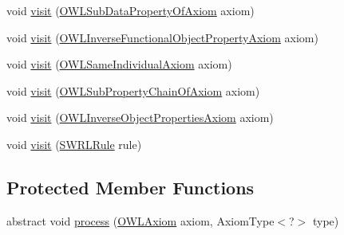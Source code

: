 \begin{DoxyCompactItemize}
void \hyperlink{classorg_1_1semanticweb_1_1owlapi_1_1util_1_1_o_w_l_axiom_type_processor_a7f7b9a60dcffb15d69dcacf790733ce5}{visit} (\hyperlink{interfaceorg_1_1semanticweb_1_1owlapi_1_1model_1_1_o_w_l_sub_data_property_of_axiom}{O\-W\-L\-Sub\-Data\-Property\-Of\-Axiom} axiom)
\item 
void \hyperlink{classorg_1_1semanticweb_1_1owlapi_1_1util_1_1_o_w_l_axiom_type_processor_ac7b5b706ad36505436fa590615f41cfb}{visit} (\hyperlink{interfaceorg_1_1semanticweb_1_1owlapi_1_1model_1_1_o_w_l_inverse_functional_object_property_axiom}{O\-W\-L\-Inverse\-Functional\-Object\-Property\-Axiom} axiom)
\item 
void \hyperlink{classorg_1_1semanticweb_1_1owlapi_1_1util_1_1_o_w_l_axiom_type_processor_ac69c5714146130044f5cae45fedaf92f}{visit} (\hyperlink{interfaceorg_1_1semanticweb_1_1owlapi_1_1model_1_1_o_w_l_same_individual_axiom}{O\-W\-L\-Same\-Individual\-Axiom} axiom)
\item 
void \hyperlink{classorg_1_1semanticweb_1_1owlapi_1_1util_1_1_o_w_l_axiom_type_processor_a4a8a06d914114183b1e20eac119e5bb4}{visit} (\hyperlink{interfaceorg_1_1semanticweb_1_1owlapi_1_1model_1_1_o_w_l_sub_property_chain_of_axiom}{O\-W\-L\-Sub\-Property\-Chain\-Of\-Axiom} axiom)
\item 
void \hyperlink{classorg_1_1semanticweb_1_1owlapi_1_1util_1_1_o_w_l_axiom_type_processor_ac53ed97782ecc43410516417169c667f}{visit} (\hyperlink{interfaceorg_1_1semanticweb_1_1owlapi_1_1model_1_1_o_w_l_inverse_object_properties_axiom}{O\-W\-L\-Inverse\-Object\-Properties\-Axiom} axiom)
\item 
void \hyperlink{classorg_1_1semanticweb_1_1owlapi_1_1util_1_1_o_w_l_axiom_type_processor_ac7007f8b45fa031633e257ae42fad9b6}{visit} (\hyperlink{interfaceorg_1_1semanticweb_1_1owlapi_1_1model_1_1_s_w_r_l_rule}{S\-W\-R\-L\-Rule} rule)
\end{DoxyCompactItemize}
\subsection*{Protected Member Functions}
\begin{DoxyCompactItemize}
\item 
abstract void \hyperlink{classorg_1_1semanticweb_1_1owlapi_1_1util_1_1_o_w_l_axiom_type_processor_a89c7a4570819d03e52dd1be7f2e3a225}{process} (\hyperlink{interfaceorg_1_1semanticweb_1_1owlapi_1_1model_1_1_o_w_l_axiom}{O\-W\-L\-Axiom} axiom, Axiom\-Type$<$?$>$ type)
\end{DoxyCompactItemize}


